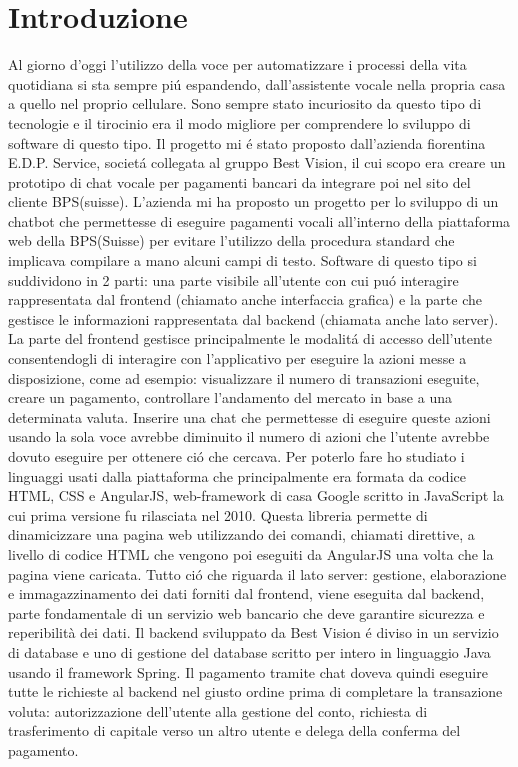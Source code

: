 \chapter{Introduzione}
Al giorno d'oggi l'utilizzo della voce per automatizzare i processi della vita quotidiana si sta sempre pi\'u espandendo, dall'assistente vocale nella propria casa a quello nel proprio cellulare. Sono sempre stato incuriosito da questo tipo di tecnologie e il tirocinio era il modo migliore per comprendere lo sviluppo di software di questo tipo. Il progetto mi \'e stato proposto dall'azienda fiorentina E.D.P. Service, societ\'a collegata al gruppo Best Vision, il cui scopo era creare un prototipo di chat vocale per pagamenti bancari da integrare poi nel sito del cliente BPS(suisse).
L'azienda mi ha proposto un progetto per lo sviluppo di un chatbot che permettesse di eseguire pagamenti vocali all'interno della piattaforma web della BPS(Suisse) per evitare l'utilizzo della procedura standard che implicava compilare a mano alcuni campi di testo.
Software di questo tipo si suddividono in 2 parti: una parte visibile all'utente con cui pu\'o interagire rappresentata dal frontend (chiamato anche interfaccia grafica) e la parte che gestisce le informazioni rappresentata dal backend (chiamata anche lato server).
La parte del frontend gestisce principalmente le modalit\'a di accesso dell'utente consentendogli di interagire con l'applicativo per eseguire la azioni messe a disposizione, come ad esempio: visualizzare il numero di transazioni eseguite, creare un pagamento, controllare l'andamento del mercato in base a una determinata valuta. Inserire una chat che permettesse di eseguire queste azioni usando la sola voce avrebbe diminuito il numero di azioni che l'utente avrebbe dovuto eseguire per ottenere ci\'o che cercava. 
Per poterlo fare ho studiato i linguaggi usati dalla piattaforma che principalmente era formata da codice HTML, CSS e AngularJS, web-framework di casa Google scritto in JavaScript la cui prima versione fu rilasciata nel 2010. Questa libreria permette di dinamicizzare una pagina web utilizzando dei comandi, chiamati direttive, a livello di codice HTML che vengono poi eseguiti da AngularJS una volta che la pagina viene caricata.
Tutto ci\'o che riguarda il lato server: gestione, elaborazione e immagazzinamento dei dati forniti dal frontend, viene eseguita dal backend, parte fondamentale di un servizio web bancario che deve garantire sicurezza e reperibilità dei dati. Il backend sviluppato da Best Vision \'e diviso in un servizio di database e uno di gestione del database scritto per intero in linguaggio Java usando il framework Spring. Il pagamento tramite chat doveva quindi eseguire tutte le richieste al backend nel giusto ordine prima di completare la transazione voluta: autorizzazione dell'utente alla gestione del conto, richiesta di trasferimento di capitale verso un altro utente e delega della conferma del pagamento.
